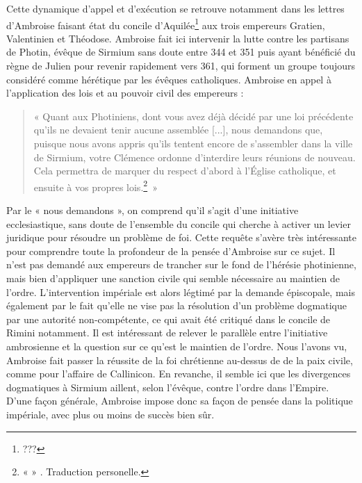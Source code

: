 \bigskip

Cette dynamique d'appel et d'exécution se retrouve notamment dans les lettres d'Ambroise faisant état du concile d'Aquilée\footnote{???} aux trois empereurs Gratien, Valentinien et Théodose. Ambroise fait ici intervenir la lutte contre les partisans de Photin, évêque de Sirmium sans doute entre 344 et 351 puis ayant bénéficié du règne de Julien pour revenir rapidement vers 361, qui forment un groupe toujours considéré comme hérétique par les évêques catholiques. Ambroise en appel à l'application des lois et au pouvoir civil des empereurs :

\bigskip

\begin{quote}
    « Quant aux Photiniens, dont vous avez déjà décidé par une loi précédente qu'ils ne devaient tenir aucune assemblée [...], nous demandons que, puisque nous avons appris qu'ils tentent encore de s'assembler dans la ville de Sirmium, votre Clémence ordonne d'interdire leurs réunions de nouveau. Cela permettra de marquer du respect d'abord à l'Église catholique, et ensuite à vos propres lois.\footnote{«  » \cite[\nopp ec. 4, 12]{ambroise_csel_82_3}. {Traduction personelle.}}~»
\end{quote}

\bigskip

Par le « nous demandons », on comprend qu'il s'agit d'une initiative ecclesiastique, sans doute de l'ensemble du concile qui cherche à activer un levier juridique pour résoudre un problème de foi. Cette requête s'avère très intéressante pour comprendre toute la profondeur de la pensée d'Ambroise sur ce sujet. Il n'est pas demandé aux empereurs de trancher sur le fond de l'hérésie photinienne, mais bien d'appliquer une sanction civile qui semble nécessaire au maintien de l'ordre. L'intervention impériale est alors légtimé par la demande épiscopale, mais également par le fait qu'elle ne vise pas la résolution d'un problème dogmatique par une autorité non-compétente, ce qui avait été critiqué dans le concile de Rimini notamment. Il est intéressant de relever le parallèle entre l'initiative ambrosienne et la question sur ce qu'est le maintien de l'ordre. Nous l'avons vu, Ambroise fait passer la réussite de la foi chrétienne au-dessus de de la paix civile, comme pour l'affaire de Callinicon. En revanche, il semble ici que les divergences dogmatiques à Sirmium aillent, selon l'évêque, contre l'ordre dans l'Empire. D'une façon générale, Ambroise impose donc sa façon de pensée dans la politique impériale, avec plus ou moins de succès bien sûr.


